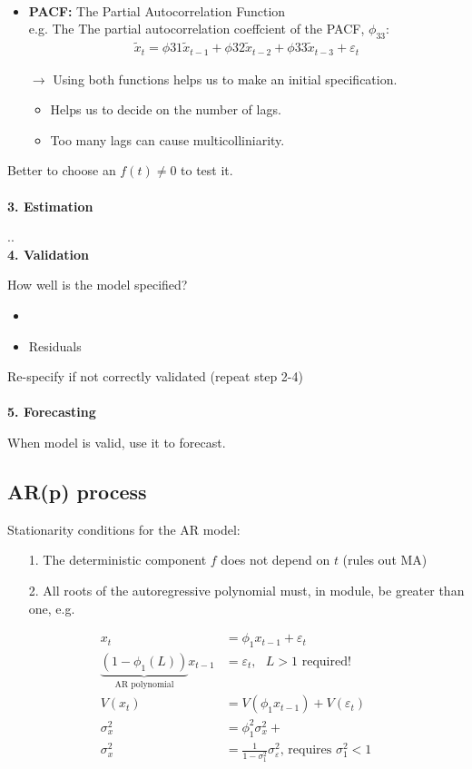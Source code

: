 \begin{multicols}{2}
\begin{itemize}
\begin{align*}
              \end{align*}
  \item \textbf{PACF:} The Partial Autocorrelation Function\\
              e.g. The The  partial autocorrelation coeffcient of the PACF, $\phi_{33}$:
              \begin{align*}
                \tilde{x}_t=\phi{31}\tilde{x}_{t-1}+\phi{32}\tilde{x}_{t-2}+\phi{33}\tilde{x}_{t-3}+\varepsilon_t
              \end{align*}
  \item [$\rightarrow$] Using both functions helps us to make an initial specification.
  \begin{itemize}
    \item Helps us to decide on the number of lags.
    \item Too many lags can cause multicolliniarity.
  \end{itemize}
\end{itemize}
Better to choose an $f(t)\neq0$ to test it.\\
\\
\textbf{3. Estimation}\par
..
\\
\textbf{4. Validation}\par
How well is the model specified?
\begin{itemize}
  \item
  \item Residuals
\end{itemize}
Re-specify if not correctly validated (repeat step 2-4)\\
\\
\textbf{5. Forecasting}\par
When model is valid, use it to forecast.


\subsection{AR(p) process}\noindent
Stationarity conditions for the AR model:
\begin{itemize}
  \item[1.] The deterministic component $f$ does not depend on $t$ (rules out MA)
  \item[2.] All roots of the autoregressive polynomial must, in module, be greater than one, e.g.\\
\end{itemize}
\begin{align*}
  x_t&=\phi_1x_{t-1}+\varepsilon_t\\
  \underbrace{(1-\phi_1 (L))}_\text{AR polynomial}x_{t-1}&=\varepsilon_t,\ \ \ L>1\textrm{ required!}\\
  V(x_t)&=V(\phi_1x_{t-1})+V(\varepsilon_t)\\
  \sigma^2_x&=\phi_1^2 \sigma_x^2 +\\
  \sigma_x^2&=\frac{1}{1-\sigma_1^2}\sigma^2_\varepsilon\textrm{,   requires }\sigma^2_1<1
\end{align*}



\end{multicols}
